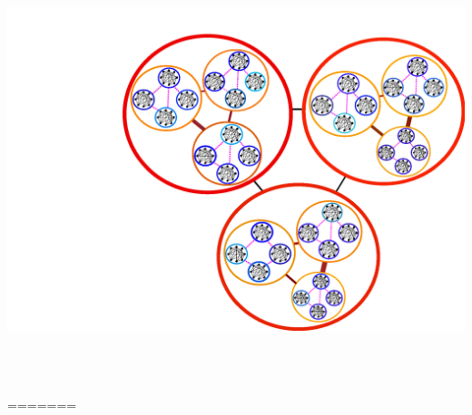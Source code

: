 \documentclass[12pt]{article}
\begin{document}
\begin{center}
\hspace{-2 in}\includegraphics[width=17cm,height=13cm]{Figure1.pdf}
\\
=======


\end{center}
\end{document}
